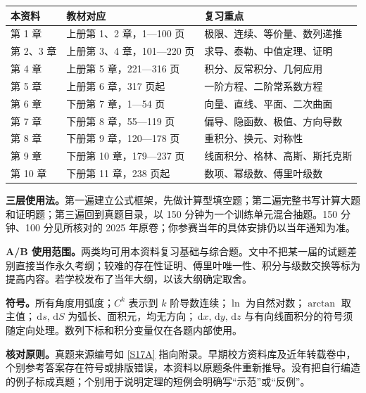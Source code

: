 \documentclass[UTF8,11pt,oneside,openany,fontset=windows]{ctexbook}
\newcommand{\dd}{\,\mathrm d}
\newcommand{\src}[1]{\hyperref[src:#1]{[S#1]}}
\newcounter{problem}
\begin{document}
\begin{longtable}{p{}p{}p{}}
\toprule 本资料 & 教材对应 & 复习重点\\\midrule\endhead
第 1 章 & 上册第 1、2 章，1—100 页 & 极限、连续、等价量、数列递推\\
第 2、3 章 & 上册第 3、4 章，101—220 页 & 求导、泰勒、中值定理、证明\\
第 4 章 & 上册第 5 章，221—316 页 & 积分、反常积分、几何应用\\
第 5 章 & 上册第 6 章，317 页起 & 一阶方程、二阶常系数方程\\
第 6 章 & 下册第 7 章，1—54 页 & 向量、直线、平面、二次曲面\\
第 7 章 & 下册第 8 章，55—119 页 & 偏导、隐函数、极值、方向导数\\
第 8 章 & 下册第 9 章，120—178 页 & 重积分、换元、对称性\\
第 9 章 & 下册第 10 章，179—237 页 & 线面积分、格林、高斯、斯托克斯\\
第 10 章 & 下册第 11 章，238 页起 & 数项、幂级数、傅里叶级数\\\bottomrule
\end{longtable}

\textbf{三层使用法。}第一遍建立公式框架，先做计算型填空题；第二遍完整书写计算大题和证明题；第三遍回到真题目录，以 150 分钟为一个训练单元混合抽题。150 分钟、100 分见所核对的 2025 年原卷；你参赛当年的具体安排仍以当年通知为准。

\textbf{A/B 使用范围。}两类均可用本资料复习基础与综合题。文中不把某一届的试题差别直接当作永久考纲；较难的存在性证明、傅里叶唯一性、积分与级数交换等标为提高内容。若学校发布了当年大纲，以该大纲确定取舍。

\textbf{符号。}所有角度用弧度；$C^k$ 表示到 $k$ 阶导数连续；$\ln$ 为自然对数；$\arctan$ 取主值；$\dd s,\dd S$ 为弧长、面积元，均无方向；$\dd x,\dd y,\dd z$ 与有向线面积分的符号须随定向处理。数列下标和积分变量仅在各题内部使用。

\textbf{核对原则。}真题来源编号如 \src{17A} 指向附录。早期校方资料库及近年转载卷中，个别参考答案存在符号或排版错误，本资料以原题条件重新推导。没有把自行编造的例子标成真题；个别用于说明定理的短例会明确写“示范”或“反例”。
\tableofcontents
\mainmatter











\appendix


\end{document}
